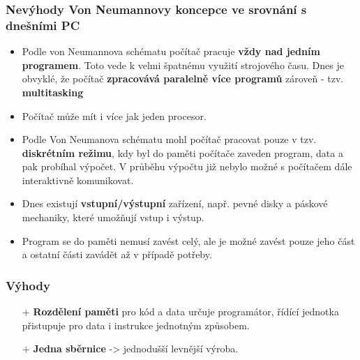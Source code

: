 \subsubsection*{Nevýhody Von Neumannovy koncepce ve srovnání s dnešními PC}
\begin{itemize}
\item Podle von Neumannova schématu počítač pracuje \textbf{vždy nad jedním programem}. Toto vede k velmi špatnému využití strojového času. Dnes je obvyklé, že počítač \textbf{zpracovává paralelně více programů} zároveň - tzv. \textbf{multitasking}
\item Počítač může mít i více jak jeden procesor.
\item Podle Von Neumanova schématu mohl počítač pracovat pouze v tzv. \textbf{diskrétním režimu}, kdy byl do paměti počítače zaveden program, data a pak probíhal výpočet. V průběhu výpočtu již nebylo možné s počítačem dále interaktivně komunikovat.
\item Dnes existují \textbf{vstupní/výstupní} zařízení, např. pevné disky a páskové mechaniky, které umožňují vstup i výstup.
\item Program se do paměti nemusí zavést celý, ale je možné zavést pouze jeho část a ostatní části zavádět až v případě potřeby.
\end{itemize}

\noindent{}

\subsubsection*{Výhody}
\begin{itemize}
	\item[$+$] \textbf{Rozdělení paměti} pro kód a data určuje programátor, řídící jednotka přistupuje pro  data i instrukce jednotným způsobem.
	\item[$+$] \textbf{Jedna sběrnice} ->  jednodušší levnější výroba.
\end{itemize}
